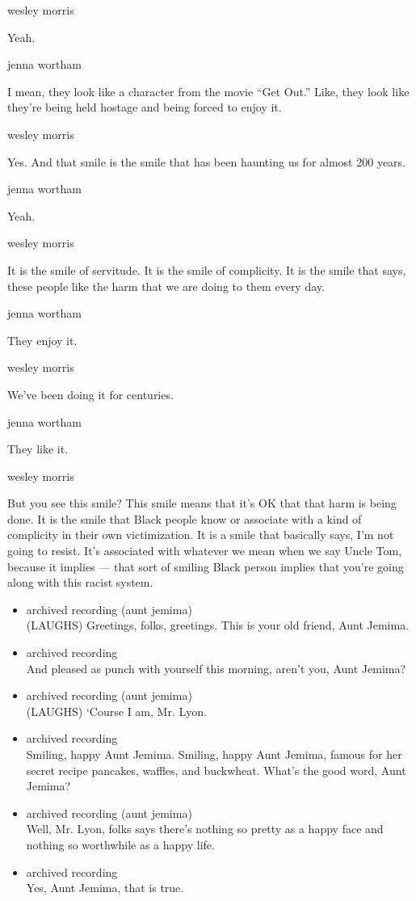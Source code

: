 wesley morris

Yeah.

jenna wortham

I mean, they look like a character from the movie ``Get Out.'' Like,
they look like they're being held hostage and being forced to enjoy it.

wesley morris

Yes. And that smile is the smile that has been haunting us for almost
200 years.

jenna wortham

Yeah.

wesley morris

It is the smile of servitude. It is the smile of complicity. It is the
smile that says, these people like the harm that we are doing to them
every day.

jenna wortham

They enjoy it.

wesley morris

We've been doing it for centuries.

jenna wortham

They like it.

wesley morris

But you see this smile? This smile means that it's OK that that harm is
being done. It is the smile that Black people know or associate with a
kind of complicity in their own victimization. It is a smile that
basically says, I'm not going to resist. It's associated with whatever
we mean when we say Uncle Tom, because it implies --- that sort of
smiling Black person implies that you're going along with this racist
system.

\begin{itemize}
\item
  archived recording (aunt jemima)\\
  (LAUGHS) Greetings, folks, greetings. This is your old friend, Aunt
  Jemima.
\item
  archived recording\\
  And pleased as punch with yourself this morning, aren't you, Aunt
  Jemima?
\item
  archived recording (aunt jemima)\\
  (LAUGHS) `Course I am, Mr. Lyon.
\item
  archived recording\\
  Smiling, happy Aunt Jemima. Smiling, happy Aunt Jemima, famous for her
  secret recipe pancakes, waffles, and buckwheat. What's the good word,
  Aunt Jemima?
\item
  archived recording (aunt jemima)\\
  Well, Mr. Lyon, folks says there's nothing so pretty as a happy face
  and nothing so worthwhile as a happy life.
\item
  archived recording\\
  Yes, Aunt Jemima, that is true.
\end{itemize}

